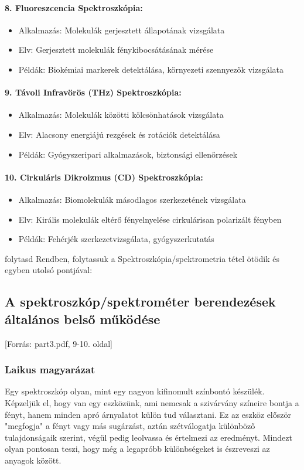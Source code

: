 \documentclass[a4paper,12pt]{article}
\begin{document}
\paragraph{8. Fluoreszcencia Spektroszkópia:} \begin{itemize} \item Alkalmazás: Molekulák gerjesztett állapotának vizsgálata \item Elv: Gerjesztett molekulák fénykibocsátásának mérése \item Példák: Biokémiai markerek detektálása, környezeti szennyezők vizsgálata \end{itemize}

\paragraph{9. Távoli Infravörös (THz) Spektroszkópia:} \begin{itemize} \item Alkalmazás: Molekulák közötti kölcsönhatások vizsgálata \item Elv: Alacsony energiájú rezgések és rotációk detektálása \item Példák: Gyógyszeripari alkalmazások, biztonsági ellenőrzések \end{itemize}

\paragraph{10. Cirkuláris Dikroizmus (CD) Spektroszkópia:} \begin{itemize} \item Alkalmazás: Biomolekulák másodlagos szerkezetének vizsgálata \item Elv: Királis molekulák eltérő fényelnyelése cirkulárisan polarizált fényben \item Példák: Fehérjék szerkezetvizsgálata, gyógyszerkutatás \end{itemize}

folytasd
Rendben, folytassuk a Spektroszkópia/spektrometria tétel ötödik és egyben utolsó pontjával:

\subsection{A spektroszkóp/spektrométer berendezések általános belső működése} [Forrás: part3.pdf, 9-10. oldal]

\subsubsection{Laikus magyarázat} Egy spektroszkóp olyan, mint egy nagyon kifinomult színbontó készülék. Képzeljük el, hogy van egy eszközünk, ami nemcsak a szivárvány színeire bontja a fényt, hanem minden apró árnyalatot külön tud választani. Ez az eszköz először "megfogja" a fényt vagy más sugárzást, aztán szétválogatja különböző tulajdonságaik szerint, végül pedig leolvassa és értelmezi az eredményt. Mindezt olyan pontosan teszi, hogy még a legapróbb különbségeket is észreveszi az anyagok között.
\end{document}
